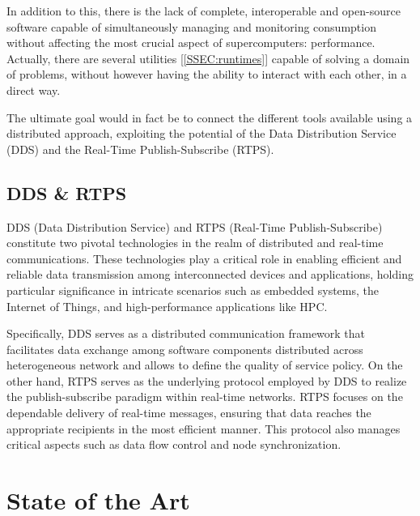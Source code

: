In addition to this, there is the lack of complete, interoperable and open-source software capable of simultaneously managing and monitoring consumption without affecting the most crucial aspect of supercomputers: performance. Actually, there are several utilities [\ref{SSEC:runtimes}] capable of solving a domain of problems, without however having the ability to interact with each other, in a direct way.

The ultimate goal would in fact be to connect the different tools available using a distributed approach, exploiting the potential of the Data Distribution Service (DDS) and the Real-Time Publish-Subscribe (RTPS).%

\subsection{DDS \& RTPS} \label{SEC:dds}
DDS (Data Distribution Service)\cite{DDS} and RTPS (Real-Time Publish-Subscribe)\cite{RTPS} constitute two pivotal technologies in the realm of distributed and real-time communications. These technologies play a critical role in enabling efficient and reliable data transmission among interconnected devices and applications, holding particular significance in intricate scenarios such as embedded systems, the Internet of Things, and high-performance applications like HPC.

Specifically, DDS serves as a distributed communication framework that facilitates data exchange among software components distributed across heterogeneous network and allows to define the quality of service policy. On the other hand, RTPS serves as the underlying protocol employed by DDS to realize the publish-subscribe paradigm within real-time networks. RTPS focuses on the dependable delivery of real-time messages, ensuring that data reaches the appropriate recipients in the most efficient manner. This protocol also manages critical aspects such as data flow control and node synchronization.

\section{State of the Art} \label{SEC:soa}

